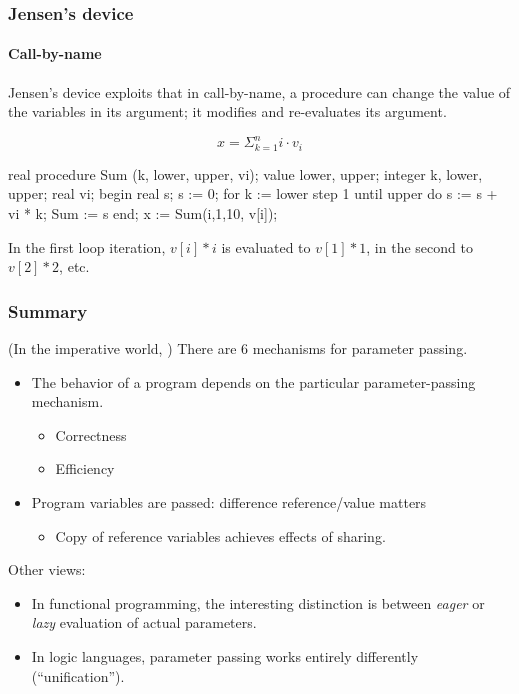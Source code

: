 \documentclass{beamer}
\begin{document}
\begin{frame}[fragile]
\frametitle{Jensen's device}
\framesubtitle{Call-by-name}
Jensen's device exploits that in call-by-name, a procedure can change the 
value of the variables in its argument; it modifies and re-evaluates
its argument. 

\[
    x = \Sigma_{k=1}^{n} i\cdot v_i
\]
\begin{cplus3}
real procedure Sum (k, lower, upper, vi); 
   value lower, upper;  
   integer k, lower, upper; real vi; 
begin 
   real s; 
   s := 0; 
   for k := lower step 1 until upper do 
      s := s + vi * k; 
   Sum := s 
end;
x := Sum(i,1,10, v[i]);
\end{cplus3}
In the first loop iteration, $v[i]*i$ is evaluated to
$v[1]*1$, in the second to $v[2]*2$, etc. 

\end{frame}


\begin{frame}
\frametitle{Summary}
(In the imperative world, ) 
There are  6 mechanisms for parameter passing. 
\begin{itemize}
\item The behavior of a program depends on the particular parameter-passing
mechanism.
\begin{itemize}
\item Correctness
\item Efficiency
\end{itemize}
\item Program variables are passed: difference reference/value matters
\begin{itemize}
\item Copy of reference variables achieves effects of sharing.
\end{itemize}

\end{itemize}

Other views:
\begin{itemize}
\item In functional programming, the interesting distinction is between
\textit{eager} or \textit{lazy} evaluation of actual parameters. 
\item In logic languages, parameter passing works entirely
differently (``unification'').
\end{itemize}

\end{frame}
\end{document}
